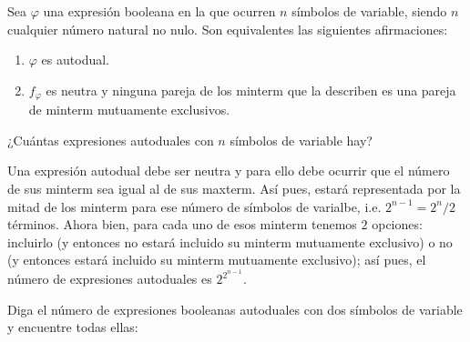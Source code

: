 \begin{theorem}
  Sea $\varphi$ una expresión booleana en la que ocurren $n$ símbolos
  de variable, siendo $n$ cualquier número natural no nulo. Son
  equivalentes las siguientes afirmaciones:
  \begin{enumerate}
  \item $\varphi$ es autodual.
  \item $f_{\varphi}$ es neutra y ninguna pareja de los minterm que la
    describen es una pareja de minterm mutuamente exclusivos.
  \end{enumerate}
\end{theorem}

\begin{exercise}
  ¿Cuántas expresiones autoduales con $n$ símbolos de variable hay?
\end{exercise}

\begin{solution}
  Una expresión autodual debe ser neutra y para ello debe ocurrir que
  el número de sus minterm sea igual al de sus maxterm. Así pues,
  estará representada por la mitad de los minterm para ese número de
  símbolos de varialbe, i.e.  $2^{n-1}=2^{n}/2$ términos. Ahora bien,
  para cada uno de esos minterm tenemos $2$ opciones: incluirlo (y
  entonces no estará incluido su minterm mutuamente exclusivo) o no (y
  entonces estará incluido su minterm mutuamente exclusivo); así pues,
  el número de expresiones autoduales es $2^{2^{n-1}}$.
\end{solution}

\begin{exercise}
  Diga el número de expresiones booleanas autoduales con dos símbolos de
  variable y encuentre todas ellas:
\end{exercise}

